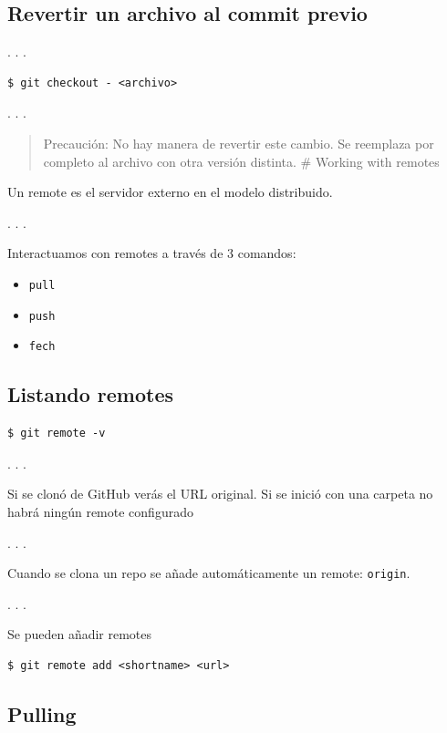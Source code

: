 \subsection{Revertir un archivo al commit previo}

. . .

\begin{lstlisting}
$ git checkout - <archivo>
\end{lstlisting}

. . .

\begin{quote}
Precaución: No hay manera de revertir este cambio. Se reemplaza por
completo al archivo con otra versión distinta. \# Working with remotes
\end{quote}

Un remote es el servidor externo en el modelo distribuido.

. . .

Interactuamos con remotes a través de 3 comandos:

\begin{itemize}
\tightlist
\item
  \passthrough{\lstinline!pull!}
\item
  \passthrough{\lstinline!push!}
\item
  \passthrough{\lstinline!fech!}
\end{itemize}

\subsection{Listando remotes}

\begin{lstlisting}
$ git remote -v
\end{lstlisting}

. . .

Si se clonó de GitHub verás el URL original. Si se inició con una
carpeta no habrá ningún remote configurado

. . .

Cuando se clona un repo se añade automáticamente un remote:
\passthrough{\lstinline!origin!}.

. . .

Se pueden añadir remotes

\begin{lstlisting}
$ git remote add <shortname> <url>
\end{lstlisting}

\subsection{Pulling}

